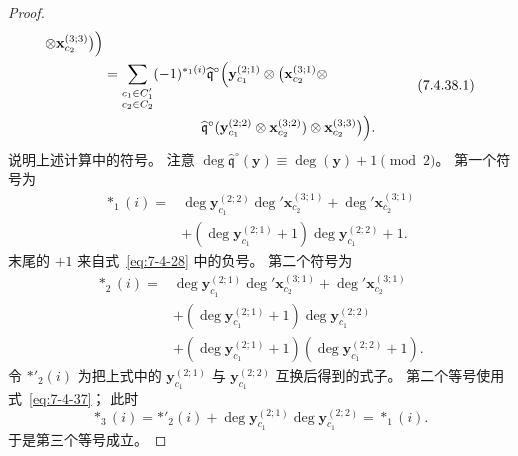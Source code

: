 \begin{proof}
\begin{equation}
\begin{aligned}
\otimes\mathbf x_{c_2}^{(3;3)}
\bigr)\Bigr)\\
&=\sum_{\substack{c_1\in C'_1\\c_2\in C_2}}
(-1)^{\ast_1(i)}
\widehat{\mathfrak q}^{\circ}
\Bigl(\mathbf y_{c_1}^{(2;1)}
\otimes\bigl(
\mathbf x_{c_2}^{(3;1)}\otimes\\
&\hspace{7em}
\widehat{\mathfrak q}^{\circ}
(\mathbf y_{c_1}^{(2;2)}
\otimes\mathbf x_{c_2}^{(3;2)})
\otimes\mathbf x_{c_2}^{(3;3)}
\bigr)\Bigr).
\end{aligned}
\tag{7.4.38.1}\label{eq:7-4-38-1}
\end{equation}
说明上述计算中的符号。
注意
$\deg\widehat{\mathfrak q}^{\circ}
(\mathbf y)
\equiv\deg(\mathbf y)+1\pmod2$。
第一个符号为
\[
\begin{aligned}
\ast_1(i)
={}&\deg\mathbf y_{c_1}^{(2;2)}
\deg'\mathbf x_{c_2}^{(3;1)}
+\deg'\mathbf x_{c_2}^{(3;1)}\\
&+(\deg\mathbf y_{c_1}^{(2;1)}+1)
\deg\mathbf y_{c_1}^{(2;2)}+1.
\end{aligned}
\]
末尾的 $+1$
来自式~\eqref{eq:7-4-28} 中的负号。
第二个符号为
\[
\begin{aligned}
\ast_2(i)
={}&\deg\mathbf y_{c_1}^{(2;1)}
\deg'\mathbf x_{c_2}^{(3;1)}
+\deg'\mathbf x_{c_2}^{(3;1)}\\
&+(\deg\mathbf y_{c_1}^{(2;1)}+1)
\deg\mathbf y_{c_1}^{(2;2)}\\
&+(\deg\mathbf y_{c_1}^{(2;1)}+1)
(\deg\mathbf y_{c_1}^{(2;2)}+1).
\end{aligned}
\]
令 $\ast'_2(i)$ 为把上式中的
$\mathbf y_{c_1}^{(2;1)}$
与 $\mathbf y_{c_1}^{(2;2)}$
互换后得到的式子。
第二个等号使用
式~\eqref{eq:7-4-37}；
此时
\[
\ast_3(i)
=\ast'_2(i)
+\deg\mathbf y_{c_1}^{(2;1)}
\deg\mathbf y_{c_1}^{(2;2)}
=\ast_1(i).
\]
于是第三个等号成立。


\end{proof}
